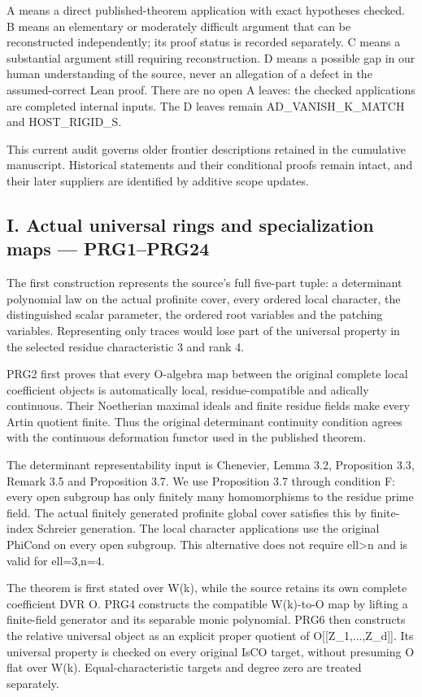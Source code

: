 A means a direct published-theorem application with exact hypotheses checked. B means an elementary or moderately difficult argument that can be reconstructed independently; its proof status is recorded separately. C means a substantial argument still requiring reconstruction. D means a possible gap in our human understanding of the source, never an allegation of a defect in the assumed-correct Lean proof. There are no open A leaves: the checked applications are completed internal inputs. The D leaves remain AD\_\allowbreak{}VANISH\_\allowbreak{}K\_\allowbreak{}MATCH and HOST\_\allowbreak{}RIGID\_\allowbreak{}S.

This current audit governs older frontier descriptions retained in the cumulative manuscript. Historical statements and their conditional proofs remain intact, and their later suppliers are identified by additive scope updates.

\subsection{I. Actual universal rings and specialization maps — PRG1–PRG24}

The first construction represents the source's full five-part tuple: a determinant polynomial law on the actual profinite cover, every ordered local character, the distinguished scalar parameter, the ordered root variables and the patching variables. Representing only traces would lose part of the universal property in the selected residue characteristic 3 and rank 4.

PRG2 first proves that every O-algebra map between the original complete local coefficient objects is automatically local, residue-compatible and adically continuous. Their Noetherian maximal ideals and finite residue fields make every Artin quotient finite. Thus the original determinant continuity condition agrees with the continuous deformation functor used in the published theorem.

The determinant representability input is Chenevier, Lemma 3.2, Proposition 3.3, Remark 3.5 and Proposition 3.7. We use Proposition 3.7 through condition F: every open subgroup has only finitely many homomorphisms to the residue prime field. The actual finitely generated profinite global cover satisfies this by finite-index Schreier generation. The local character applications use the original PhiCond on every open subgroup. This alternative does not require ell>n and is valid for ell=3,n=4.

The theorem is first stated over W(k), while the source retains its own complete coefficient DVR O. PRG4 constructs the compatible W(k)-to-O map by lifting a finite-field generator and its separable monic polynomial. PRG6 then constructs the relative universal object as an explicit proper quotient of O[[Z\_\allowbreak{}1,...,Z\_\allowbreak{}d]]. Its universal property is checked on every original IsCO target, without presuming O flat over W(k). Equal-characteristic targets and degree zero are treated separately.

